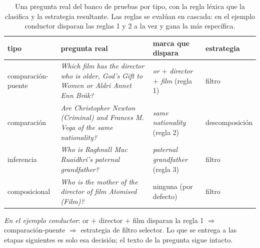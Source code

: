 \documentclass[11pt,a4paper]{article}
\begin{document}
\begin{table}[t]
\centering\footnotesize\setlength{\tabcolsep}{3.5pt}
\caption{Una pregunta real del banco de pruebas por tipo, con la regla
léxica que la clasifica y la estrategia resultante. Las reglas se evalúan
en cascada: en el ejemplo conductor disparan las reglas 1 y 2 a la vez y
gana la más específica.}
\label{tab:router-ejemplos}
\begin{tabular}{p{}p{}p{}l}
\toprule
tipo & pregunta real & marca que dispara & estrategia\\
\midrule
comparación-puente & \emph{Which film has the director who is older,
  God's Gift to Women or Aldri Annet Enn Bråk?} & \emph{or} $+$
  \emph{director} $+$ \emph{film} (regla 1) & filtro\\
comparación & \emph{Are Christopher Newton (Criminal) and Frances M.
  Vega of the same nationality?} & \emph{same nationality} (regla 2) &
  descomposición\\
inferencia & \emph{Who is Raghnall Mac Ruaidhrí's paternal grandfather?}
  & \emph{paternal grandfather} (regla 3) & filtro\\
composicional & \emph{Who is the mother of the director of film Atomised
  (Film)?} & ninguna (por defecto) & filtro\\
\bottomrule
\end{tabular}
\end{table}

\emph{En el ejemplo conductor}: \guillemotleft{}or\guillemotright{} $+$ \guillemotleft{}director\guillemotright{} $+$ \guillemotleft{}film\guillemotright{}
disparan la regla 1 $\Rightarrow$ comparación-puente $\Rightarrow$
estrategia de filtro selector. Lo que se entrega a las etapas siguientes
es solo esa decisión; el texto de la pregunta sigue intacto.
\end{document}
